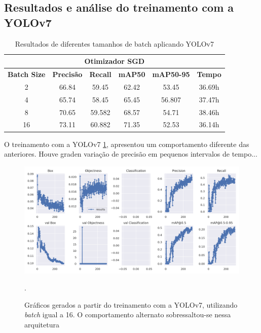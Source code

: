 \subsection{Resultados e análise do treinamento com a YOLOv7}

\begin{table}[!hbt]
    \centering
    \begin{tabular}{|c|c|c|c|c|c|}
    \hline
    \multicolumn{6}{|c|}{\textbf{Otimizador SGD}} \\ \hline
    \textbf{Batch Size} & \textbf{Precisão} & \textbf{Recall} & \textbf{mAP50} & \textbf{mAP50-95} & \textbf{Tempo} \\ \hline
    2                   & 66.84                 & 59.45              & 62.42              & 53.45                 & 36.69h             \\ \hline
    4                   & 65.74                & 58.45               & 65.45            & 56.807                & 37.47h             \\ \hline
    8                   & 70.65                 & 59.582               & 68.57             & 54.71               & 38.46h             \\ \hline
    16                  & 73.11                 & 60.882               & 71.35               & 52.53                & 36.14h            \\ \hline
    \end{tabular}
    \caption{Resultados de diferentes tamanhos de batch aplicando YOLOv7}
    \label{tab:yolov7-teste}
\end{table}


O treinamento com a YOLOv7 \ref{tab:yolov7-teste}, apresentou um comportamento diferente das anteriores. Houve graden variação de precisão em pequenos intervalos de tempo...

\begin{figure}[!h]
    \centering
    \begin{minipage}{1\linewidth}
    \centering
    \captionsetup{justification=centering,margin=0.5cm,font=small}
    \includegraphics[width=1\linewidth]{img/cap6/results-yolov7-batch-16.png}
    \caption{Gráficos gerados a partir do treinamento com a YOLOv7, utilizando \textit{batch} igual a 16. O comportamento alternato sobressaltou-se nessa arquitetura}.
    \label{fig:yolov5batch16}
    \end{minipage}
\end{figure}

